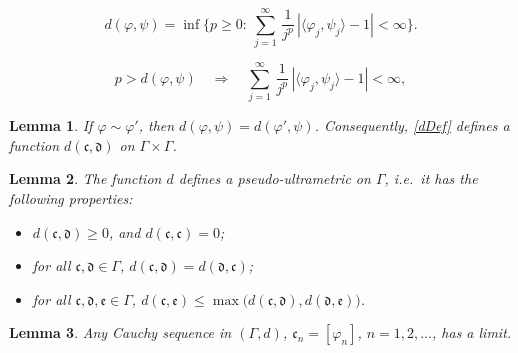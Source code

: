 \documentclass[10pt,a4paper]{amsart}
\newtheorem{lemma}{Lemma}
\def\fc{{\mathfrak{c}}}
\def\fd{{\mathfrak{d}}}
\def\fe{{\mathfrak{e}}}
\begin{document}
\begin{equation}\label{dDef}
d(\varphi,\psi)=\inf\Big\{p\geq 0:\:\sum _{j=1}^\infty\,\frac{1}{j^p}\,|\langle \varphi_j,\psi_j\rangle-1|<\infty\Big\}.
\end{equation}

\begin{equation}\label{upSet}
p>d(\varphi,\psi)\quad\Longrightarrow\quad\sum _{j=1}^\infty\,\frac{1}{j^p}\,|\langle \varphi_j,\psi_j\rangle-1|<\infty,
\end{equation}

\begin{lemma}\label{classInv}
If $\varphi\sim\varphi'$, then $d(\varphi,\psi)=d(\varphi',\psi)$. Consequently, \eqref{dDef} defines a function $d(\fc,\fd)$ on $\Gamma\times\Gamma$.
\end{lemma}

\begin{lemma}\label{ultraLem}
The function $d$ defines a pseudo-ultrametric on $\Gamma$, i.e.\ it has the following properties:
\begin{itemize}
\item[(i)]{$d(\fc,\fd)\geq 0$, and $d(\fc,\fc)=0$;}
\item[(ii)]{for all $\fc,\fd\in\Gamma$, $d(\fc,\fd)=d(\fd,\fc)$;}
\item[(iii)]{for all $\fc,\fd,\fe\in\Gamma$, $d(\fc,\fe)\leq \max\big(d(\fc,\fd),d(\fd,\fe)\big)$.}
\end{itemize}
\end{lemma}

\begin{lemma}\label{complLem}
Any Cauchy sequence in $(\Gamma,d)$, $\fc_n=[\varphi_n]$, $n=1,2,\ldots$, has a limit.
\end{lemma}
\end{document}
